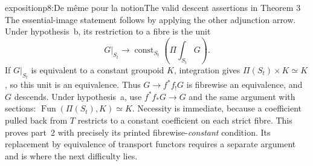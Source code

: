 \begin{dcomment}{exposition}{p8:De même pour la notion}{The valid descent assertions in Theorem 3}
The essential-image statement follows by applying the other adjunction arrow. Under hypothesis~b, its restriction to a fibre is the unit
\[
 G|_{S_t}\longrightarrow
 \operatorname{const}_{S_t}\!\left(\Pi\!\int_{S_t}G\right).
\]
If $G|_{S_t}$ is equivalent to a constant groupoid $K$, integration gives $\Pi(S_t)\times K\simeq K$, so this unit is an equivalence. Thus $G\to f^*f_!G$ is fibrewise an equivalence, and $G$ descends. Under hypothesis~a, use $f^*f_*G\to G$ and the same argument with sections: $\operatorname{Fun}(\Pi(S_t),K)\simeq K$. Necessity is immediate, because a coefficient pulled back from $T$ restricts to a constant coefficient on each strict fibre. This proves part~2 with precisely its printed fibrewise-\emph{constant} condition. Its replacement by equivalence of transport functors requires a separate argument and is where the next difficulty lies.
\end{dcomment}

